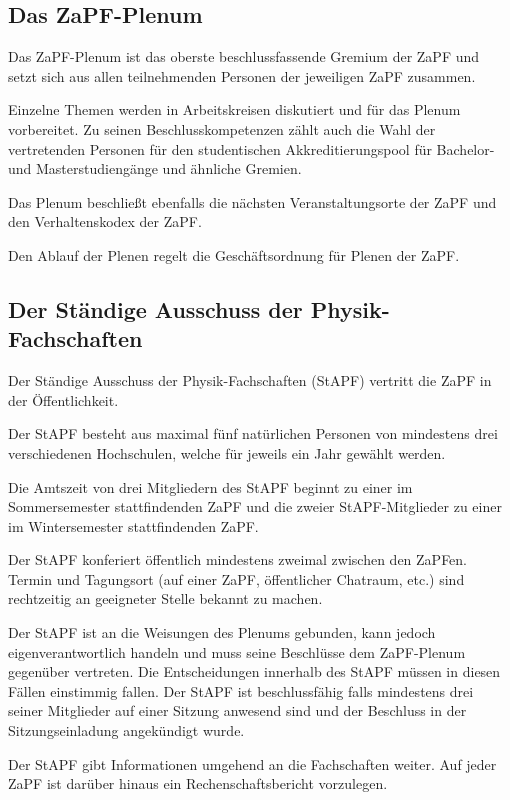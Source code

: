 \documentclass[
  a4paper,
  oneside]{scrartcl}
\begin{document}
\subsection{Das ZaPF-Plenum}\label{das-zapf-plenum}

Das ZaPF-Plenum ist das oberste beschlussfassende Gremium der ZaPF und
setzt sich aus allen teilnehmenden Personen der jeweiligen ZaPF
zusammen.

Einzelne Themen werden in Arbeitskreisen diskutiert und für das Plenum
vorbereitet. Zu seinen Beschlusskompetenzen zählt auch die Wahl der
vertretenden Personen für den studentischen Akkreditierungspool für
Bachelor- und Masterstudiengänge und ähnliche Gremien.

Das Plenum beschließt ebenfalls die nächsten Veranstaltungsorte der ZaPF
und den Verhaltenskodex der ZaPF.

Den Ablauf der Plenen regelt die Geschäftsordnung für Plenen der ZaPF.

\subsection{Der Ständige Ausschuss der
Physik-Fachschaften}\label{der-stuxe4ndige-ausschuss-der-physik-fachschaften}

Der Ständige Ausschuss der Physik-Fachschaften (StAPF) vertritt die ZaPF
in der Öffentlichkeit.

Der StAPF besteht aus maximal fünf natürlichen Personen von mindestens
drei verschiedenen Hochschulen, welche für jeweils ein Jahr gewählt
werden.

Die Amtszeit von drei Mitgliedern des StAPF beginnt zu einer im
Sommersemester stattfindenden ZaPF und die zweier StAPF-Mitglieder zu
einer im Wintersemester stattfindenden ZaPF.

Der StAPF konferiert öffentlich mindestens zweimal zwischen den ZaPFen.
Termin und Tagungsort (auf einer ZaPF, öffentlicher Chatraum, etc.) sind
rechtzeitig an geeigneter Stelle bekannt zu machen.

Der StAPF ist an die Weisungen des Plenums gebunden, kann jedoch
eigenverantwortlich handeln und muss seine Beschlüsse dem ZaPF-Plenum
gegenüber vertreten. Die Entscheidungen innerhalb des StAPF müssen in
diesen Fällen einstimmig fallen. Der StAPF ist beschlussfähig falls
mindestens drei seiner Mitglieder auf einer Sitzung anwesend sind und
der Beschluss in der Sitzungseinladung angekündigt wurde.

Der StAPF gibt Informationen umgehend an die Fachschaften weiter. Auf
jeder ZaPF ist darüber hinaus ein Rechenschaftsbericht vorzulegen.
\end{document}
